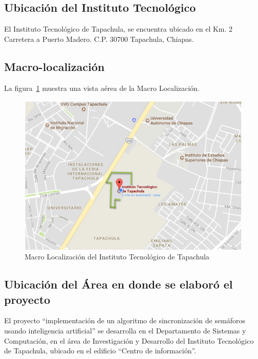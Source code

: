 \newpage

\subsection*{Ubicación del Instituto Tecnológico}
El Instituto Tecnológico de Tapachula, se encuentra ubicado en el Km. 2 Carretera a Puerto Madero. C.P. 30700 Tapachula, Chiapas.

%
\subsection*{Macro-localización}

La figura~\ref{fig:macroloc} muestra una vista aérea de la Macro Localización.

\begin{figure}[H]
\centering
\includegraphics[scale=0.8]{sources/macrolocalizacion.png}
\caption{Macro Localización del Instituto Tecnológico de Tapachula}\label{fig:macroloc}
\end{figure}

\pagebreak
\subsection*{Ubicación del Área en donde se elaboró el proyecto}

El proyecto “implementación de un algoritmo de sincronización de semáforos usando inteligencia artificial” se desarrolla en el Departamento de Sistemas y Computación, en el área de Investigación y Desarrollo del Instituto Tecnológico de Tapachula, ubicado en el edificio “Centro de información”.

